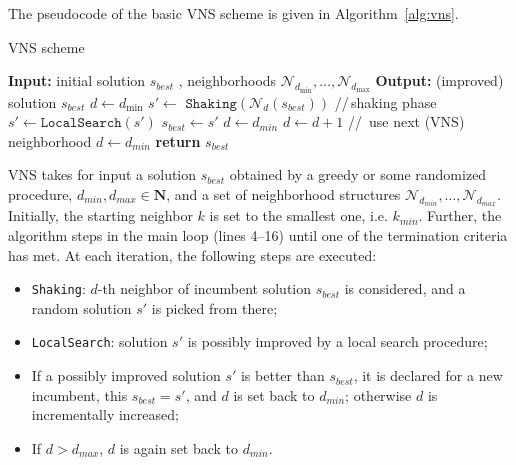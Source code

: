 \documentclass[sigconf]{acmart}
\begin{document}
  The pseudocode of the basic VNS scheme is given in Algorithm~\ref{alg:vns}.
  
     \begin{algorithm}[!t] 
  	\caption{VNS scheme}\label{alg:vns}
  	\begin{algorithmic}[1]
  		\STATE \textbf{Input:} initial solution $s_{best}$ , neighborhoods  $\mathcal{N}_{d_{\min}},\ldots, \mathcal{N}_{d_{\max}}$ 
  		\STATE \textbf{Output:} (improved) solution $s_{best}$
  		\STATE $d \gets  d_{\min}$
  		\STATE  $s' \gets$  $\texttt{Shaking}(\mathcal{N}_d(s_{best}))$ \hspace{0.3cm}//\,shaking phase
  		\STATE $s' \gets  \texttt{LocalSearch}(s {'})$
  		\STATE $s _{best}\gets s'$
  		\STATE $d \gets d_{min}$
  		\ELSE 
  		\STATE $d \gets d+1$ \hspace{0.3cm}//\, use next (VNS) neighborhood
  		\STATE $d\gets d_{min}$
  		\ENDIF
  		\ENDIF
  		\ENDWHILE
  		\STATE \textbf{return} $s_{best}$
  	\end{algorithmic}
  \end{algorithm}

 VNS takes for input a solution $s_{best}$ obtained by a greedy or some randomized procedure, $d_{min}, d_{max} \in \mathbf{N}$, 
  and a set of neighborhood structures $\mathcal{N}_{d_{min}}, \ldots, \mathcal{N}_{d_{max}}$.  
  Initially, the starting neighbor $k$ is set to the smallest one, i.e. $k_{min}$. Further, the algorithm steps in the main loop (lines 4--16) until one of the termination criteria has met. At each iteration, the following steps are executed: %
  
  \begin{itemize}
  	\item \texttt{Shaking}: $d$-th neighbor of incumbent solution $s_{best}$ is considered, and a random solution $s'$ is picked from there;
  	\item  \texttt{LocalSearch}: solution $s'$ is possibly improved by a local search procedure;
  	\item If a possibly improved solution $s'$ is better than $s_{best}$, it is declared for a new incumbent, this $s_{best} = s'$, and $d$ is set back to $d_{min}$; otherwise $d$ is incrementally increased;
  	\item  If $d> d_{max}$, $d$ is again set back to $d_{min}$.
   \end{itemize}
    
\end{document}
